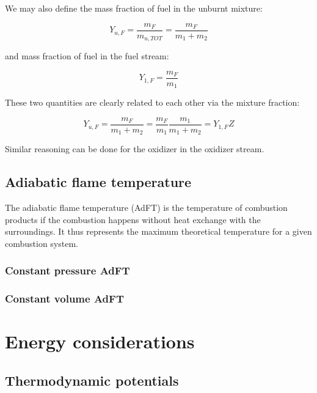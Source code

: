 \documentclass[10pt,twocolumn]{article}
\begin{document}
We may also define the mass fraction of fuel in the unburnt mixture:

\begin{equation}
Y_{u, F} = \frac{m_F}{m_{u, TOT}} = \frac{m_F}{m_1 + m_2}
\end{equation}

and mass fraction of fuel in the fuel stream:

\begin{equation}
Y_{1, F} = \frac{m_F}{m_1}
\end{equation}

These two quantities are clearly related to each other via the mixture fraction:

\begin{equation}
Y_{u, F} = \frac{m_F}{m_1 + m_2} = \frac{m_F}{m_1} \frac{m_1}{m_1 + m_2} = Y_{1, F} Z
\end{equation}

Similar reasoning can be done for the oxidizer in the oxidizer stream.

\subsection{Adiabatic flame temperature}

The adiabatic flame temperature (AdFT) is the temperature of combustion products if the combustion happens without heat exchange with the surroundings. It thus represents the maximum theoretical temperature for a given combustion system.

\subsubsection{Constant pressure AdFT}



\subsubsection{Constant volume AdFT}











\section{Energy considerations}


\subsection{Thermodynamic potentials}
\end{document}
